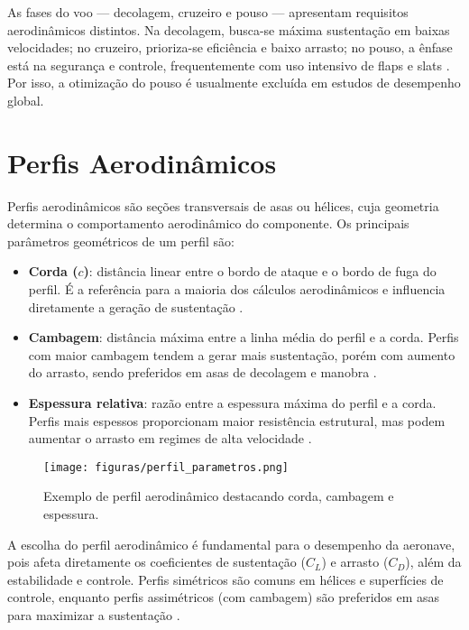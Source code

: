 As fases do voo — decolagem, cruzeiro e pouso — apresentam requisitos aerodinâmicos distintos. Na decolagem, busca-se máxima sustentação em baixas velocidades; no cruzeiro, prioriza-se eficiência e baixo arrasto; no pouso, a ênfase está na segurança e controle, frequentemente com uso intensivo de flaps e slats \cite{raymer2018aircraft}. Por isso, a otimização do pouso é usualmente excluída em estudos de desempenho global.

\section{Perfis Aerodinâmicos}
Perfis aerodinâmicos são seções transversais de asas ou hélices, cuja geometria determina o comportamento aerodinâmico do componente. Os principais parâmetros geométricos de um perfil são:

\begin{itemize}
    \item \textbf{Corda (\(c\))}: distância linear entre o bordo de ataque e o bordo de fuga do perfil. É a referência para a maioria dos cálculos aerodinâmicos e influencia diretamente a geração de sustentação \cite{anderson2017fundamentals}.
    \item \textbf{Cambagem}: distância máxima entre a linha média do perfil e a corda. Perfis com maior cambagem tendem a gerar mais sustentação, porém com aumento do arrasto, sendo preferidos em asas de decolagem e manobra \cite{abbott1959theory}.
    \item \textbf{Espessura relativa}: razão entre a espessura máxima do perfil e a corda. Perfis mais espessos proporcionam maior resistência estrutural, mas podem aumentar o arrasto em regimes de alta velocidade \cite{anderson2017fundamentals}.
\end{itemize}

\begin{figure}[H]
    \centering
    \texttt{[image: figuras/perfil\_parametros.png]}
    \caption{Exemplo de perfil aerodinâmico destacando corda, cambagem e espessura.}
    \label{fig:perfil_parametros}
\end{figure}

A escolha do perfil aerodinâmico é fundamental para o desempenho da aeronave, pois afeta diretamente os coeficientes de sustentação (\(C_L\)) e arrasto (\(C_D\)), além da estabilidade e controle. Perfis simétricos são comuns em hélices e superfícies de controle, enquanto perfis assimétricos (com cambagem) são preferidos em asas para maximizar a sustentação \cite{abbott1959theory}.

